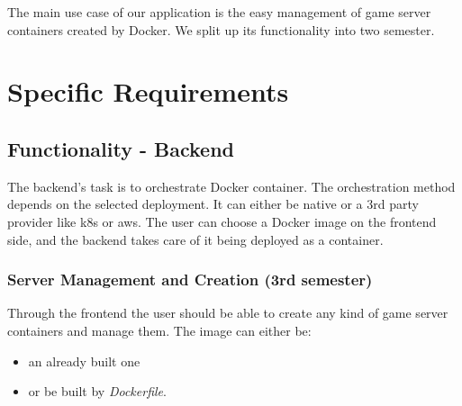 \documentclass[a4paper,12pt,chapterprefix=false,bibliography=totoc,listof=totoc,]{scrreprt}
\begin{document}
The main use case of our application is the easy management of game server containers created by Docker. We split up its functionality into two semester.

\chapter{Specific Requirements}

\section{Functionality - Backend}


The backend's task is to orchestrate Docker container. The orchestration method depends on the selected deployment. It can either be native or a 3rd party provider like \gls{k8s} or \gls{aws}. The user can choose a Docker image on the frontend side, and the backend takes care of it being deployed as a container.

\subsection{Server Management and Creation (3rd semester)}
Through the frontend the user should be able to create any kind of game server containers and manage them. The image can either be:
\begin{itemize}
	\item an already built one 
	\item or be built by \emph{Dockerfile}.
\end{itemize}
 
\end{document}
